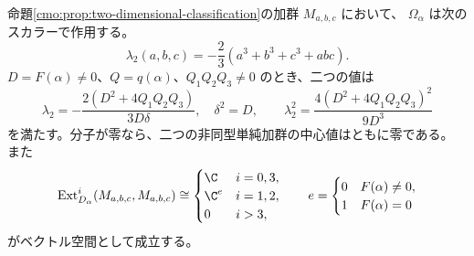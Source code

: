 \begin{proposition}[中心固有値と既約二次元加群の剛性]
\label{cmo:prop:two-dimensional-center-rigidity}
命題\ref{cmo:prop:two-dimensional-classification}の加群 $M_{a,b,c}$ において、
$\Omega_\alpha$ は次のスカラーで作用する。
\begin{equation}\label{cmo:eq:two-dimensional-lambda}
 \lambda_2(a,b,c)=-\frac23(a^3+b^3+c^3+abc).
\end{equation}
$D=F(\alpha)\ne0$、$Q=q(\alpha)$、$Q_1Q_2Q_3\ne0$ のとき、二つの値は
\begin{equation}\label{cmo:eq:two-dimensional-lambda-polynomial}
 \lambda_2=-\frac{2(D^2+4Q_1Q_2Q_3)}{3D\delta},\quad \delta^2=D,
 \qquad
 \lambda_2^2=\frac{4(D^2+4Q_1Q_2Q_3)^2}{9D^3}
\end{equation}
を満たす。分子が零なら、二つの非同型単純加群の中心値はともに零である。
また
\begin{equation}\label{cmo:eq:two-dimensional-self-ext}
 \operatorname{Ext}_{D_\alpha}^i(M_{a,b,c},M_{a,b,c})
 \cong
 \begin{cases}
 \C&i=0,3,\\
 \C^{e}&i=1,2,\\
 0&i>3,
 \end{cases}
 \qquad
 e=\begin{cases}0&F(\alpha)\ne0,\\1&F(\alpha)=0\end{cases}
\end{equation}
がベクトル空間として成立する。
\end{proposition}


